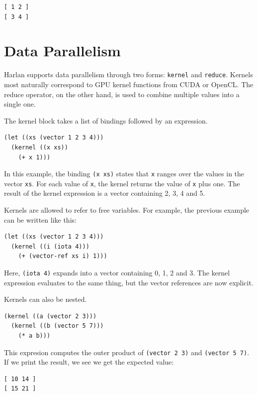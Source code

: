 \documentclass[oneside]{report}
\begin{document}
\begin{verbatim}
[ 1 2 ]
[ 3 4 ]
\end{verbatim}

\section{Data Parallelism}

Harlan supports data parallelism through two forms: \lstinline{kernel}
and \lstinline{reduce}. Kernels most naturally correspond to GPU
kernel functions from CUDA or OpenCL. The reduce operator, on the
other hand, is used to combine multiple values into a single
one. 

The kernel block takes a list of bindings followed by an
expression.

\begin{lstlisting}
(let ((xs (vector 1 2 3 4)))
  (kernel ((x xs))
    (+ x 1)))
\end{lstlisting}

In this example, the binding \lstinline{(x xs)} states that
\lstinline{x} ranges over the values in the vector \lstinline{xs}. For
each value of \lstinline{x}, the kernel returns the value of
\lstinline{x} plus one. The result of the kernel expression is a
vector containing 2, 3, 4 and 5.

Kernels are allowed to refer to free variables. For example, the
previous example can be written like this:

\begin{lstlisting}
(let ((xs (vector 1 2 3 4)))
  (kernel ((i (iota 4)))
    (+ (vector-ref xs i) 1)))
\end{lstlisting}

Here, \lstinline{(iota 4)} expands into a vector containing 0, 1, 2
and 3. The kernel expression evaluates to the same thing, but the
vector references are now explicit.

Kernels can also be nested.

\begin{lstlisting}
(kernel ((a (vector 2 3)))
  (kernel ((b (vector 5 7)))
    (* a b)))  
\end{lstlisting}

This expresion computes the outer product of \lstinline{(vector 2 3)}
and \lstinline{(vector 5 7)}. If we print the result, we see we get
the expected value:

\begin{verbatim}
[ 10 14 ]
[ 15 21 ]
\end{verbatim}
\end{document}
